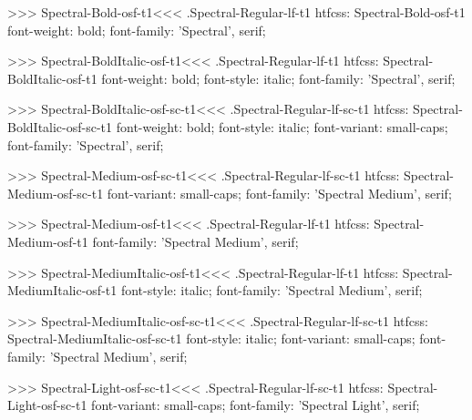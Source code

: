 >>>
\<Spectral-Bold-osf-t1\><<<
.Spectral-Regular-lf-t1
htfcss:  Spectral-Bold-osf-t1  font-weight: bold; font-family: 'Spectral', serif;

>>>
\<Spectral-BoldItalic-osf-t1\><<<
.Spectral-Regular-lf-t1
htfcss:  Spectral-BoldItalic-osf-t1  font-weight: bold; font-style: italic; font-family: 'Spectral', serif;

>>>
\<Spectral-BoldItalic-osf-sc-t1\><<<
.Spectral-Regular-lf-sc-t1
htfcss:  Spectral-BoldItalic-osf-sc-t1  font-weight: bold; font-style: italic; font-variant: small-caps; font-family: 'Spectral', serif;

>>>
\<Spectral-Medium-osf-sc-t1\><<<
.Spectral-Regular-lf-sc-t1
htfcss:  Spectral-Medium-osf-sc-t1  font-variant: small-caps; font-family: 'Spectral Medium', serif;

>>>
\<Spectral-Medium-osf-t1\><<<
.Spectral-Regular-lf-t1
htfcss:  Spectral-Medium-osf-t1  font-family: 'Spectral Medium', serif;

>>>
\<Spectral-MediumItalic-osf-t1\><<<
.Spectral-Regular-lf-t1
htfcss:  Spectral-MediumItalic-osf-t1  font-style: italic; font-family: 'Spectral Medium', serif;

>>>
\<Spectral-MediumItalic-osf-sc-t1\><<<
.Spectral-Regular-lf-sc-t1
htfcss:  Spectral-MediumItalic-osf-sc-t1  font-style: italic; font-variant: small-caps; font-family: 'Spectral Medium', serif;

>>>
\<Spectral-Light-osf-sc-t1\><<<
.Spectral-Regular-lf-sc-t1
htfcss:  Spectral-Light-osf-sc-t1  font-variant: small-caps; font-family: 'Spectral Light', serif;

